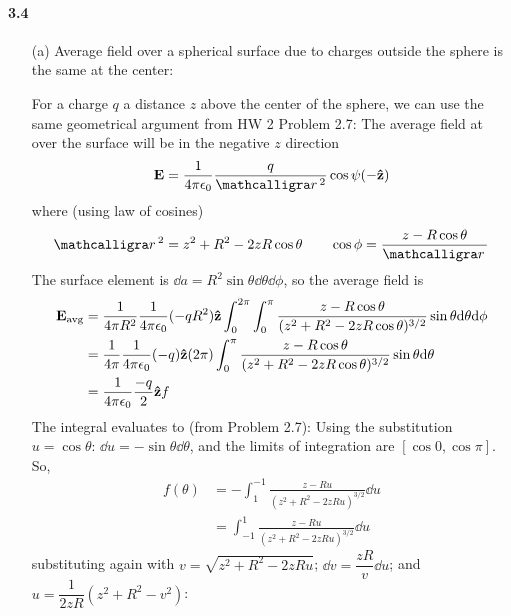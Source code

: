 \documentclass[../main.tex]{subfiles}
\begin{document}
\pagestyle{fancy}

\setcounter{section}{3}

\paragraph{3.4} 
\begin{enumerate}
    \item [(a)] Average field over a spherical surface due to charges outside the sphere is the same at the center:

    For a charge $q$ a distance $z$ above the center of the sphere, 
    we can use the same geometrical argument from HW 2 Problem 2.7:
    The average field at over the surface will be in the negative $z$ direction
    \begin{align*}
        \vb E = \ke \frac{q}{\scriptr^2} \cos\psi (-\vu z)
    \end{align*}
    where (using law of cosines)
    \begin{align*}
        \scriptr^2 = z^2 + R^2 - 2zR\cos\theta \qquad \cos\phi = \frac{z - R\cos\theta}{\scriptr}
    \end{align*}
    The surface element is $\dd a = R^2 \sin\theta \dd \theta \dd\phi$, so the average field is 
    \begin{align*}
        \vb E_\text{avg} &= \frac{1}{4\pi R^2} \frac{1}{4\pi\epsilon_0} (-qR^2) \vu z \int_0^{2\pi} \int_0^\pi \frac{z - R\cos\theta}{(z^2 + R^2 - 2zR\cos\theta)^{3/2}} \sin \theta \dd\theta \dd\phi \\
        &= \frac{1}{4\pi} \frac{1}{4\pi\epsilon_0} (-q) \vu z (2\pi) \int_0^\pi \frac{z - R\cos\theta}{(z^2 + R^2 - 2zR\cos\theta)^{3/2}} \sin \theta \dd\theta \\
        &= \frac{1}{4\pi\epsilon_0} \frac{-q}{2} \vu z f
    \end{align*}
    The integral evaluates to (from Problem 2.7):
    Using the substitution $u = \cos\theta$: $\dd{u} = -\sin\theta \dd{\theta}$, and the limits of
    integration are $[\cos{0}, \cos{\pi}]$. So,
    \begin{align*}
        f(\theta) &= -\int_{1}^{-1} \frac{z - Ru}{(z^2 + R^2 - 2zRu)^{3/2}} \dd{u} \\
        &= \int_{-1}^{1} \frac{z - Ru}{(z^2 + R^2 - 2zRu)^{3/2}} \dd{u}
    \end{align*}
    substituting again with $v = \sqrt{z^2 + R^2 - 2zRu}$; $\dd{v} = \dfrac{zR}{v} \dd{u}$; and $
    u = \dfrac{1}{2zR}(z^2 + R^2 - v^2)$:
    \begin{align*}

\end{align*}
\end{enumerate}
\end{document}
